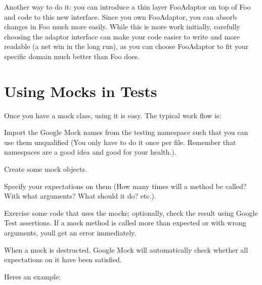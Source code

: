 Another way to do it\+: you can introduce a thin layer {\ttfamily Foo\+Adaptor} on top of {\ttfamily Foo} and code to this new interface. Since you own {\ttfamily Foo\+Adaptor}, you can absorb changes in {\ttfamily Foo} much more easily. While this is more work initially, carefully choosing the adaptor interface can make your code easier to write and more readable (a net win in the long run), as you can choose {\ttfamily Foo\+Adaptor} to fit your specific domain much better than {\ttfamily Foo} does.

\section*{Using Mocks in Tests}

Once you have a mock class, using it is easy. The typical work flow is\+:


\begin{DoxyEnumerate}
\item Import the Google Mock names from the {\ttfamily testing} namespace such that you can use them unqualified (You only have to do it once per file. Remember that namespaces are a good idea and good for your health.).
\end{DoxyEnumerate}
\begin{DoxyEnumerate}
\item Create some mock objects.
\end{DoxyEnumerate}
\begin{DoxyEnumerate}
\item Specify your expectations on them (How many times will a method be called? With what arguments? What should it do? etc.).
\end{DoxyEnumerate}
\begin{DoxyEnumerate}
\item Exercise some code that uses the mocks; optionally, check the result using Google Test assertions. If a mock method is called more than expected or with wrong arguments, you\textquotesingle{}ll get an error immediately.
\end{DoxyEnumerate}
\begin{DoxyEnumerate}
\item When a mock is destructed, Google Mock will automatically check whether all expectations on it have been satisfied.
\end{DoxyEnumerate}

Here\textquotesingle{}s an example\+:


